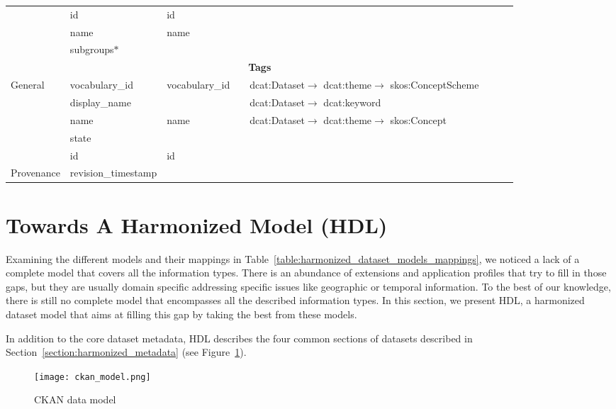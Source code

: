 \begin{landscape}
{\begin{longtable}{|p{1cm}|m{3.1cm}|m{2.4cm}|m{2.5cm}|p{3.8cm}|m{3.8cm}|m{5.55cm}|m{2.5cm}|}
\cline{2-8}
 & id & id &  &  &  &  & \tabularnewline
\cline{2-8}
 & name & name &  &  &  &  & \tabularnewline
\cline{2-8}
 & subgroups$\ast$ &  &  &  &  &  & \tabularnewline
\hline
\multicolumn{8}{|c|}{\cellcolor{blue!25}\textbf{Tags}}\tabularnewline
\hline
\multirow{5}{2cm}{General} & vocabulary\_id & vocabulary\_id &  & dcat:Dataset$\rightarrow$ dcat:theme$\rightarrow$ skos:ConceptScheme &  &  & \tabularnewline
\cline{2-8}
 & display\_name &  &  & dcat:Dataset$\rightarrow$ dcat:keyword &  &  & \tabularnewline
\cline{2-8}
 & name & name &  & dcat:Dataset$\rightarrow$ dcat:theme$\rightarrow$ skos:Concept &  &  & \tabularnewline
\cline{2-8}
 & state &  &  &  &  &  & \tabularnewline
\cline{2-8}
 & id & id &  &  &  &  & \tabularnewline
\hline
Provenance & revision\_timestamp &  &  &  &  &  & \tabularnewline
\hline
\end{longtable}
}
\end{landscape}

\restoregeometry
\pagestyle{standard}


\section{Towards A Harmonized Model (HDL)}
\label{section:hdl}

Examining the different models and their mappings in Table~\ref{table:harmonized_dataset_models_mappings}, we noticed a lack of a complete model that covers all the information types. There is an abundance of extensions and application profiles that try to fill in those gaps, but they are usually domain specific addressing specific issues like geographic or temporal information. To the best of our knowledge, there is still no complete model that encompasses all the described information types. In this section, we present HDL, a harmonized dataset model that aims at filling this gap by taking the best from these models.

In addition to the core dataset metadata, HDL describes the four common sections of datasets described in Section~\ref{section:harmonized_metadata} (see Figure~\ref{fig:ckan_model}).


\begin{figure}[ht!]
\centering
	\texttt{[image: ckan\_model.png]}
	\caption{CKAN data model}
	\label{fig:ckan_model}
\end{figure}

